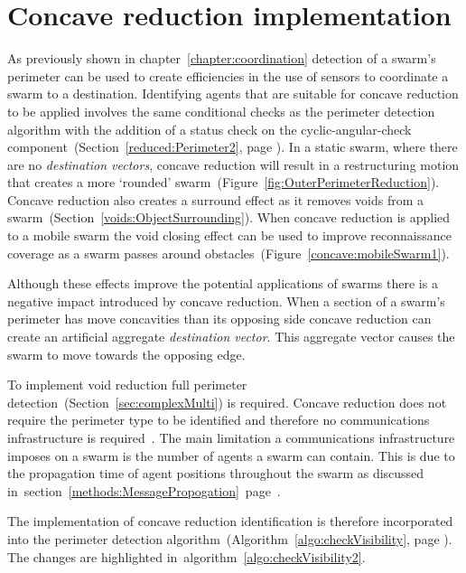 \section{Concave reduction implementation}\label{sec:ConcaveReductionImp}
As previously shown in chapter~\ref{chapter:coordination} detection of a swarm's perimeter can be used to create efficiencies in the use of sensors to coordinate a swarm to a destination. Identifying agents that are suitable for concave reduction to be applied involves the same conditional checks as the perimeter detection algorithm with the addition of a status check on the cyclic-angular-check component~(Section~\ref{reduced:Perimeter2}, page \pageref{reduced:Perimeter2}). In a static swarm, where there are no \textit{destination vectors}, concave reduction will result in a restructuring motion that creates a more `rounded' swarm~(Figure~\ref{fig:OuterPerimeterReduction}). Concave reduction also creates a surround effect as it removes voids from a swarm~(Section~\ref{voids:ObjectSurrounding}). When concave reduction is applied to a mobile swarm the void closing effect can be used to improve reconnaissance coverage as a swarm passes around obstacles~(Figure~\ref{concave:mobileSwarm1}).

Although these effects improve the potential applications of swarms there is a negative impact introduced by concave reduction. When a section of a swarm's perimeter has move concavities than its opposing side concave reduction can create an artificial aggregate \textit{destination vector}. This aggregate vector causes the swarm to move towards the opposing edge. 

To implement void reduction full perimeter detection~(Section~\ref{sec:complexMulti}) is required. Concave reduction does not require the perimeter type to be identified and therefore no communications infrastructure is required~\cite{MD:09,NIM:09,SOM:12,ZFG:13,JG:13}. The main limitation a communications infrastructure imposes on a swarm is the number of agents a swarm can contain. This is due to the propagation time of agent positions throughout the swarm as discussed in~section~\ref{methods:MessagePropogation}~page~\pageref{methods:MessagePropogation}. 

The implementation of concave reduction identification is therefore incorporated into the perimeter detection algorithm~(Algorithm~\ref{algo:checkVisibility}, page \pageref{algo:checkVisibility}). The changes are highlighted in~algorithm~\ref{algo:checkVisibility2}.\\

